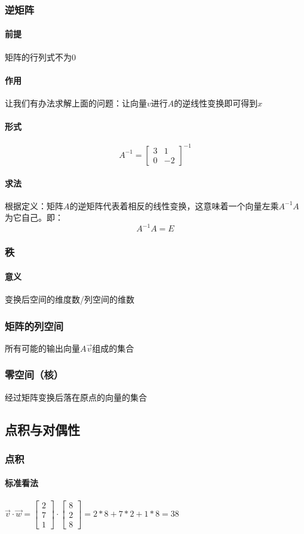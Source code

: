 \documentclass[UTF8]{ctexart}
\begin{document}
\subsubsection{逆矩阵}
\paragraph{前提}
矩阵的行列式不为0
\paragraph{作用}
让我们有办法求解上面的问题：让向量$v$进行$A$的逆线性变换即可得到$x$
\paragraph{形式}
$$A^{-1} = \begin{bmatrix}
	3&1\\0&-2
\end{bmatrix}^{-1}$$
\paragraph{求法}
根据定义：矩阵$A$的逆矩阵代表着相反的线性变换，这意味着一个向量左乘$A^{-1}A$为它自己。即：
$$A^{-1}A=E$$
\subsubsection{秩}
\paragraph{意义}
变换后空间的维度数/列空间的维数
\subsubsection{矩阵的列空间}
所有可能的输出向量$A\overrightarrow{v}$组成的集合
\subsubsection{零空间（核）}
经过矩阵变换后落在原点的向量的集合

\subsection{点积与对偶性}
\subsubsection{点积}
\paragraph{标准看法}
$\overrightarrow{v}\cdot\overrightarrow{w} = \begin{bmatrix}
	2 \\ 7 \\ 1
\end{bmatrix} \cdot \begin{bmatrix}
	8 \\ 2 \\ 8
\end{bmatrix} = 2*8+7*2+1*8 = 38$
\end{document}
